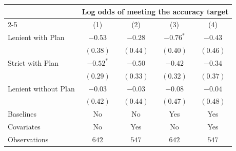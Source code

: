 \begin{tabular}{l c c c c}
\toprule
 & \multicolumn{4}{c}{Log odds of meeting the accuracy target} \\
\cmidrule(lr){2-5}
 & (1) & (2) & (3) & (4) \\
\midrule
Lenient with Plan    & $-0.53$     & $-0.28$  & $-0.76^{*}$ & $-0.43$  \\
                     & $(0.38)$    & $(0.44)$ & $(0.40)$    & $(0.46)$ \\
Strict with Plan     & $-0.52^{*}$ & $-0.50$  & $-0.42$     & $-0.34$  \\
                     & $(0.29)$    & $(0.33)$ & $(0.32)$    & $(0.37)$ \\
Lenient without Plan & $-0.03$     & $-0.03$  & $-0.08$     & $-0.04$  \\
                     & $(0.42)$    & $(0.44)$ & $(0.47)$    & $(0.48)$ \\
\midrule
Baselines            & No          & No       & Yes         & Yes      \\
Covariates           & No          & Yes      & No          & Yes      \\
Observations            & $642$       & $547$    & $642$       & $547$    \\
\bottomrule
\end{tabular}
